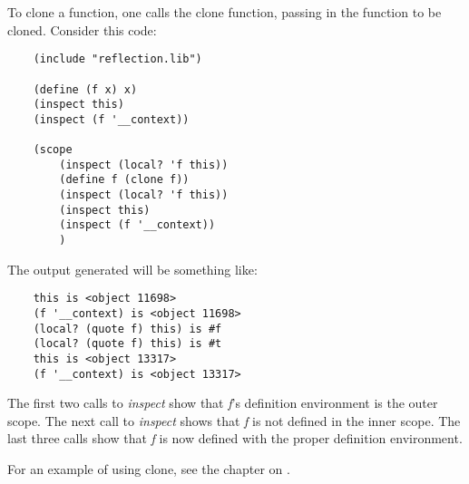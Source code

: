 To clone a function, one calls the clone function, passing
in the function to be cloned. Consider this code:

\begin{verbatim}
    (include "reflection.lib")

    (define (f x) x)
    (inspect this)
    (inspect (f '__context))

    (scope
        (inspect (local? 'f this))
        (define f (clone f))
        (inspect (local? 'f this))
        (inspect this)
        (inspect (f '__context))
        )
\end{verbatim}

The output generated will be something like:

\begin{verbatim}
    this is <object 11698>
    (f '__context) is <object 11698>
    (local? (quote f) this) is #f
    (local? (quote f) this) is #t
    this is <object 13317>
    (f '__context) is <object 13317>
\end{verbatim}

The first two calls to {\it inspect} show that {\it f}'s definition
environment is the outer scope. The next call to {\it inspect} shows that
{\it f} is not defined in the inner scope. The last three calls show that
{\it f} is now defined with the proper definition environment.

For an example of using clone, see the chapter on
.
